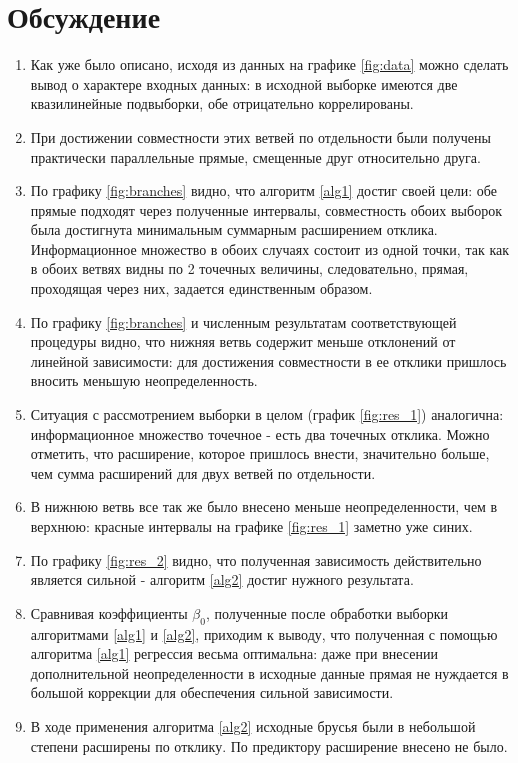 \documentclass[a4paper]{article}
\begin{document}
\section{Обсуждение}
\begin{enumerate}
    \item Как уже было описано, исходя из данных на графике \ref{fig:data} можно сделать вывод о характере входных данных: в исходной выборке имеются две квазилинейные подвыборки, обе отрицательно коррелированы.
    \item При достижении совместности этих ветвей по отдельности были получены практически параллельные прямые, смещенные друг относительно друга. 
    \item По графику \ref{fig:branches} видно, что алгоритм \ref{alg1} достиг своей цели: обе прямые подходят через полученные интервалы, совместность обоих выборок была достигнута минимальным суммарным расширением отклика. Информационное множество в обоих случаях состоит из одной точки, так как в обоих ветвях видны по 2 точечных величины, следовательно, прямая, проходящая через них, задается единственным образом. 
    \item По графику \ref{fig:branches} и численным результатам соответствующей процедуры видно, что нижняя ветвь содержит меньше отклонений от линейной зависимости: для достижения совместности в ее отклики пришлось вносить меньшую неопределенность.
    \item Ситуация с рассмотрением выборки в целом (график \ref{fig:res_1}) аналогична: информационное множество точечное - есть два точечных отклика. Можно отметить, что расширение, которое пришлось внести, значительно больше, чем сумма расширений для двух ветвей по отдельности. 
    \item В нижнюю ветвь все так же было внесено меньше неопределенности, чем в верхнюю: красные интервалы на графике \ref{fig:res_1} заметно уже синих.
    \item По графику \ref{fig:res_2} видно, что полученная зависимость действительно является сильной - алгоритм \ref{alg2} достиг нужного результата. 
    \item Сравнивая коэффициенты $\beta_0$, полученные после обработки выборки алгоритмами \ref{alg1} и \ref{alg2}, приходим к выводу, что полученная с помощью алгоритма \ref{alg1} регрессия весьма оптимальна: даже при внесении дополнительной неопределенности в исходные данные прямая не нуждается в большой коррекции для обеспечения сильной зависимости. 
    \item В ходе применения алгоритма \ref{alg2} исходные брусья были в небольшой степени расширены по отклику. По предиктору расширение внесено не было.

\end{enumerate}
\end{document}
